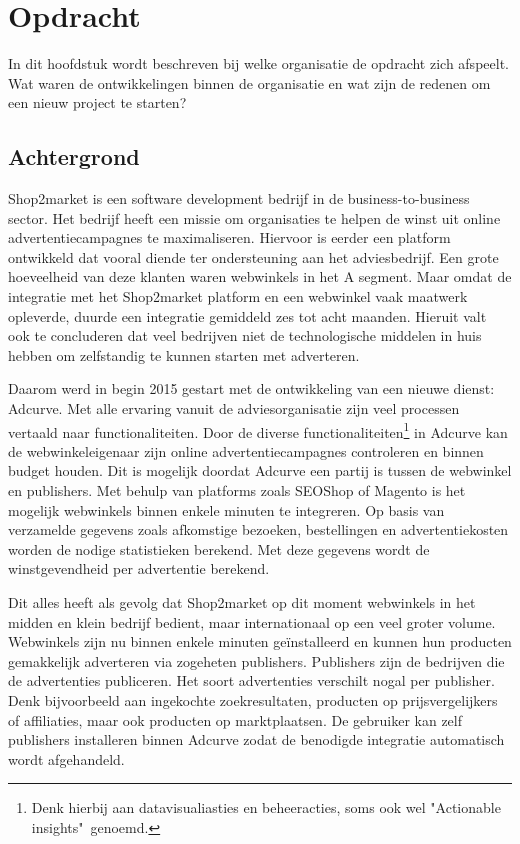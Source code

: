 \chapter{Opdracht}
In dit hoofdstuk wordt beschreven bij welke organisatie de opdracht zich afspeelt. Wat waren de ontwikkelingen binnen de organisatie en wat zijn de redenen om een nieuw project te starten?

\section{Achtergrond}

Shop2market is een software development bedrijf in de business-to-business sector. Het bedrijf heeft een missie om organisaties te helpen de winst uit online advertentiecampagnes te maximaliseren. Hiervoor is eerder een platform ontwikkeld dat vooral diende ter ondersteuning aan het adviesbedrijf. Een grote hoeveelheid van deze klanten waren webwinkels in het A segment. Maar omdat de integratie met het Shop2market platform en een webwinkel vaak maatwerk opleverde, duurde een integratie gemiddeld zes tot acht maanden. Hieruit valt ook te concluderen dat veel bedrijven niet de technologische middelen in huis hebben om zelfstandig te kunnen starten met adverteren.

Daarom werd in begin 2015 gestart met de ontwikkeling van een nieuwe dienst: Adcurve. Met alle ervaring vanuit de adviesorganisatie zijn veel processen vertaald naar functionaliteiten. Door de diverse functionaliteiten\footnote{ Denk hierbij aan datavisualiasties en beheeracties, soms ook wel "Actionable insights"\  genoemd.} in Adcurve kan de webwinkeleigenaar zijn online advertentiecampagnes controleren en binnen budget houden. Dit is mogelijk doordat Adcurve een partij is tussen de webwinkel en publishers. Met behulp van platforms zoals SEOShop of Magento is het mogelijk webwinkels binnen enkele minuten te integreren. 
Op basis van verzamelde gegevens zoals afkomstige bezoeken, bestellingen en advertentiekosten worden de nodige statistieken berekend. Met deze gegevens wordt de winstgevendheid per advertentie berekend.


Dit alles heeft als gevolg dat Shop2market op dit moment webwinkels in het midden en klein bedrijf  bedient, maar internationaal op een veel groter volume. Webwinkels zijn nu binnen enkele minuten geïnstalleerd en kunnen hun producten gemakkelijk adverteren via zogeheten publishers. Publishers zijn de bedrijven die de advertenties publiceren. Het soort advertenties verschilt nogal per publisher. Denk bijvoorbeeld aan ingekochte zoekresultaten, producten op prijsvergelijkers of affiliaties, maar ook producten op marktplaatsen. De gebruiker kan zelf publishers installeren binnen Adcurve zodat de benodigde integratie automatisch wordt afgehandeld. 


